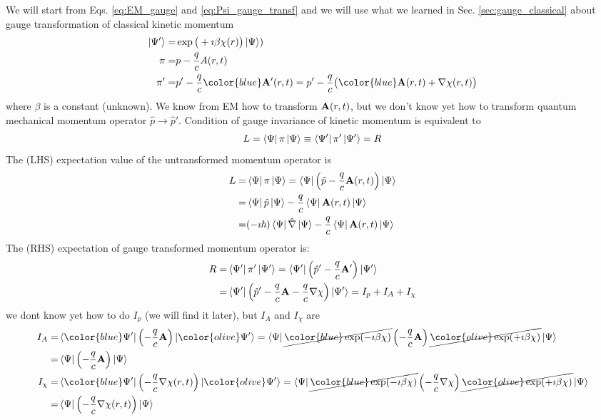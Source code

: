 \documentclass[11pt]{article}
\begin{document}
We will start from  Eqs. \ref{eq:EM_gauge}  and \ref{eq:Psi_gauge_transf} and we will use what we learned in Sec. \ref{sec:gauge_classical} about  gauge  transformation of  classical kinetic momentum  
\begin{align*}
    \ket{\Psi'} =& \exp\big(+\imath \beta  \chi(r) \big) \ket{\Psi} )\\
    \pi        =& p  - \frac{q}{c} A(r,t) \\ 
    \pi '       =& p' - \frac{q}{c} {\color{blue} \vb A'(r,t) }
       = p' - \frac{q}{c} \big({\color{blue} \vb A(r,t) + \nabla \chi(r,t)}\big)
\end{align*}
where $\beta$ is a constant (unknown).  We know from EM how to transform  $\vb A(r,t)$, but we don't know yet  how to transform quantum mechanical momentum operator $\hat p \to \hat p'$. Condition of gauge invariance of kinetic momentum is equivalent  to 
\begin{align}
L =\bra{\Psi} \pi \ket{\Psi} \equiv \bra{\Psi'} \pi' \ket{\Psi'}= R
\label{eq:momentum_gauge}
\end{align}
The (LHS) expectation value of the untransformed   momentum operator is
\begin{align*}
    L = &\bra{\Psi} \pi \ket{\Psi}  = \bra{\Psi} \left( \hat p - \frac{q}{c} \vb A(r,t) \right) \ket{\Psi} \\
    =& \bra{\Psi} \hat p\ket{\Psi} -  \frac{q}{c} \bra{\Psi} \vb A(r,t) \ket{\Psi} \\
    =& (-\imath \hbar) \bra{\Psi} \hat \nabla \ket{\Psi} -  \frac{q}{c} \bra{\Psi} \vb A(r,t) \ket{\Psi} \\
\end{align*}
The (RHS)  expectation of  gauge transformed   momentum operator is:
\begin{align*}
    R=   &\bra{\Psi'} \pi' \ket{\Psi'}  = \bra{\Psi'} \left( \hat p' - \frac{q}{c} \vb A' \right) \ket{\Psi'} \\
    =&  \bra{\Psi'} \left( \hat p' - \frac{q}{c} \vb A  - \frac{q}{c} \vb \nabla \chi \right) \ket{\Psi'} =  I_p + I_A + I_\chi
\end{align*}
we dont know yet how to do $I_p$ (we will find it later), but  $I_A$ and $I_\chi$ are
\begin{align*}
I_A =& \bra{\color{blue} \Psi'} \left(-\frac{q}{c} \vb A\right) \ket{{\color{olive} \Psi'}} =   
   {\bra{\Psi} \cancel{ \color{blue} \exp(-\imath \beta \chi)} }
    \left(-\frac{q}{c} \vb A \right)  {  \cancel{\color{olive} \exp(+\imath \beta \chi)}}   \ket{\Psi}  \\ 
    =& \bra{ \Psi} \left(-\frac{q}{c} \vb A\right) \ket{ \Psi} \\
I_\chi =& \bra{\color{blue} \Psi'} \left(-\frac{q}{c} \nabla \chi(r,t) \right) \ket{{\color{olive} \Psi'}} =  
 {\bra{\Psi} \cancel{ \color{blue} \exp(-\imath \beta \chi)} }
\left(-\frac{q}{c} \nabla \chi \right) 
{  \cancel{\color{olive} \exp(+\imath \beta \chi)}}   \ket{\Psi}  \\ 
=&  \bra{ \Psi} \left(-\frac{q}{c} \nabla \chi (r,t) \right) \ket{ \Psi} 
\end{align*}
\end{document}
